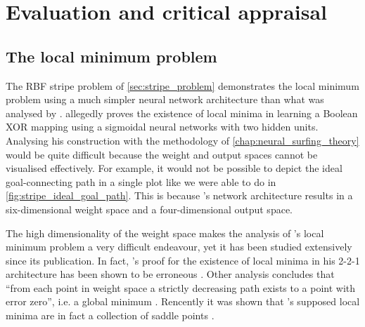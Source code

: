 \chapter{Evaluation and critical appraisal}

\section{The local minimum problem}
\label{sec:eval_local_minimum_problem}
The RBF stripe problem of \ref{sec:stripe_problem} demonstrates the local minimum problem using a much simpler neural network architecture than what was analysed by \textcite{blum1989}. 
\citeauthor{blum1989} allegedly proves the existence of local minima in learning a Boolean XOR mapping using a sigmoidal neural networks with two hidden units.
Analysing his construction with the methodology of \ref{chap:neural_surfing_theory} would be quite difficult because the weight and output spaces cannot be visualised effectively.
For example, it would not be possible to depict the ideal goal-connecting path in a single plot like we were able to do in \ref{fig:stripe_ideal_goal_path}.
This is because \citeauthor{blum1989}'s network architecture results in a six-dimensional weight space and a four-dimensional output space. 

The high dimensionality of the weight space makes the analysis of \citeauthor{blum1989}'s local minimum problem a very difficult endeavour, yet it has been studied extensively since its publication.
In fact, \citeauthor{blum1989}'s proof for the existence of local minima in his 2-2-1 architecture has been shown to be erroneous \cite{hamey1998}. 
Other analysis concludes that ``from each point in weight space a strictly decreasing path exists to a point with error zero'', i.e. a global minimum \cite*{sprinkhuizen1999}.
Rencently it was shown that \citeauthor{blum1989}'s supposed local minima are in fact a collection of saddle points \cite{mizutani2010}.


